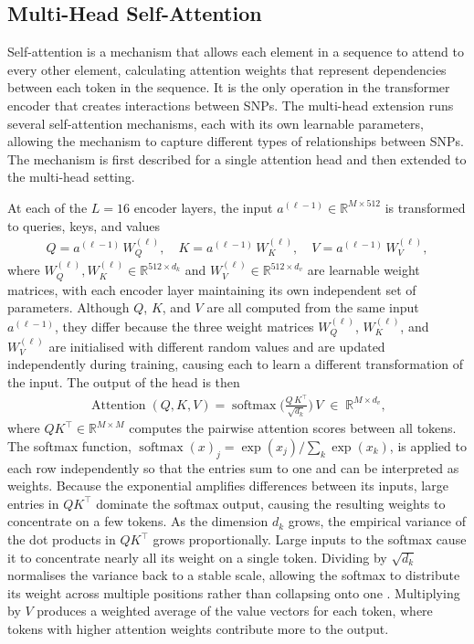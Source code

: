 \subsection{Multi-Head Self-Attention}
\label{sec:mhsa}
Self-attention is a mechanism that allows each element in a sequence to attend to every other element, calculating attention weights that represent dependencies between each token in the sequence. It is the only operation in the transformer encoder that creates interactions between SNPs. The multi-head extension runs several self-attention mechanisms, each with its own learnable parameters, allowing the mechanism to capture different types of relationships between SNPs. The mechanism is first described for a single attention head and then extended to the multi-head setting.

At each of the $L = 16$ encoder layers, the input $a^{(\ell - 1)} \in \mathbb{R}^{M \times 512}$ is transformed to queries, keys, and values
\begin{align*}
    Q = a^{(\ell - 1)}\, W_{Q}^{(\ell)}, \quad
    K = a^{(\ell - 1)}\, W_{K}^{(\ell)}, \quad
    V = a^{(\ell - 1)}\, W_{V}^{(\ell)},
\end{align*}
where $W_{Q}^{(\ell)}, W_{K}^{(\ell)} \in \mathbb{R}^{512 \times d_k}$ and $W_{V}^{(\ell)} \in
\mathbb{R}^{512 \times d_v}$ are learnable weight matrices, with each
encoder layer maintaining its own independent set of parameters. Although $Q$, $K$, and $V$ are all computed from the same input $a^{(\ell-1)}$, they differ because the three weight matrices $W_Q^{(\ell)}$, $W_K^{(\ell)}$, and $W_V^{(\ell)}$ are initialised with different random values and are updated independently during training, causing each to learn a different transformation of the input. The output of the head is then
\begin{align*}
    \operatorname{Attention}(Q, K, V) = \operatorname{softmax}\!\biggl(
        \frac{Q\, K^\top}{\sqrt{d_k}}
    \biggr)\, V
    \;\in\; \mathbb{R}^{M \times d_v},
\end{align*}
where $QK^\top \in \mathbb{R}^{M \times M}$ computes the pairwise attention scores between all tokens. The softmax function, $\operatorname{softmax}(x)_j = \exp(x_j) / \sum_{k} \exp(x_k)$, is applied to each row independently so that the entries sum to one and can be interpreted as weights. Because the exponential amplifies differences between its inputs, large entries in $QK^\top$ dominate the softmax output, causing the resulting weights to concentrate on a few tokens. As the dimension $d_k$ grows, the empirical variance of the dot products in $QK^\top$ grows proportionally. Large inputs to the softmax cause it to concentrate nearly all its weight on a single token. Dividing by $\sqrt{d_k}$ normalises the variance back to a stable scale, allowing the softmax to distribute its weight across multiple positions rather than collapsing onto one \citep{AttentionIsAllYouNeed}. Multiplying by $V$ produces a weighted average of the value vectors for each token, where tokens with higher attention weights contribute more to the output.

